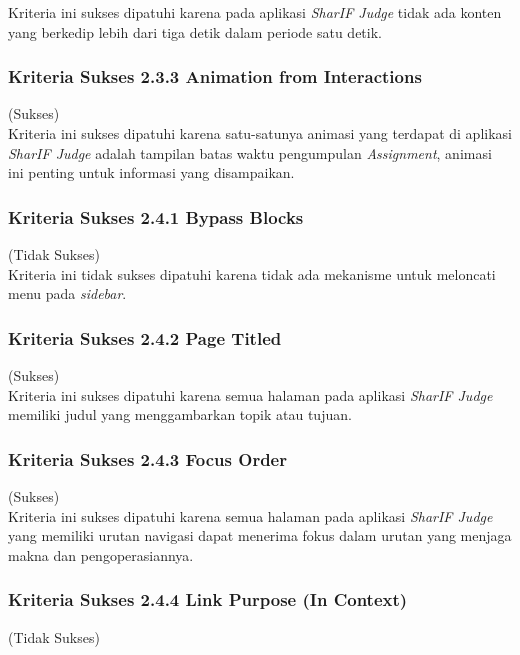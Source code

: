 \documentclass[a4paper,twoside]{article}
\begin{document}
\begin{enumerate}
		Kriteria ini sukses dipatuhi karena pada aplikasi \textit{SharIF Judge} tidak ada konten yang berkedip lebih dari tiga detik dalam periode satu detik.
		
		\subsubsection*{Kriteria Sukses 2.3.3 Animation from Interactions}
		\label{subsubsec:kepatuhan_kriteria_2.3.3}
		(Sukses) \\
		
		Kriteria ini sukses dipatuhi karena satu-satunya animasi yang terdapat di aplikasi \textit{SharIF Judge} adalah tampilan batas waktu pengumpulan \textit{Assignment}, animasi ini penting untuk informasi yang disampaikan.
		
		\subsubsection*{Kriteria Sukses 2.4.1 Bypass Blocks}
		\label{subsubsec:kepatuhan_kriteria_2.4.1}
		(Tidak Sukses) \\
		
		Kriteria ini tidak sukses dipatuhi karena tidak ada mekanisme untuk meloncati menu pada \textit{sidebar}.
		
		\subsubsection*{Kriteria Sukses 2.4.2 Page Titled}
		\label{subsubsec:kepatuhan_kriteria_2.4.2}
		(Sukses) \\
		
		Kriteria ini sukses dipatuhi karena semua halaman pada aplikasi \textit{SharIF Judge} memiliki judul yang menggambarkan topik atau tujuan.
		
		\subsubsection*{Kriteria Sukses 2.4.3 Focus Order}
		\label{subsubsec:kepatuhan_kriteria_2.4.3}
		(Sukses) \\
		
		Kriteria ini sukses dipatuhi karena semua halaman pada aplikasi \textit{SharIF Judge} yang memiliki urutan navigasi dapat menerima fokus dalam urutan yang menjaga makna dan pengoperasiannya.
		
		\subsubsection*{Kriteria Sukses 2.4.4 Link Purpose (In Context)}
		\label{subsubsec:kepatuhan_kriteria_2.4.4}
		(Tidak Sukses) \\
		

\end{enumerate}
\end{document}
